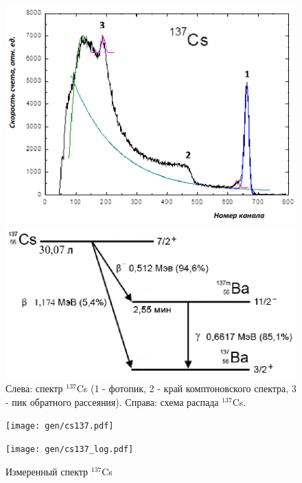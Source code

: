 \documentclass[12pt,a4paper]{article}
\begin{document}
	\begin{figure}[H]
		\centering
		\begin{minipage}{0.55\textwidth}
			\centering
			\includegraphics[width=0.9\linewidth]{res/cs_spectre.png}
		\end{minipage}%
		\begin{minipage}{0.45\textwidth}
			\centering
			\includegraphics[width=1.0\linewidth]{res/cs_levels.png}
		\end{minipage}
		\caption{\centering
			Слева: спектр $^{137}$Cs (1 - фотопик, 2 - край комптоновского спектра, 3 - пик обратного рассеяния).
			Справа: схема распада $^{137}$Cs.}
		\label{fig:cs_scheme}
	\end{figure}
	
	\begin{figure}[H]
		\centering
		\begin{minipage}{0.5\textwidth}
			\centering
			\texttt{[image: gen/cs137.pdf]}
		\end{minipage}%
		\begin{minipage}{0.5\textwidth}
			\centering
			\texttt{[image: gen/cs137\_log.pdf]}
		\end{minipage}
		\caption{Измеренный спектр $^{137}$Cs}
		\label{fig:cs_spectrum}
	\end{figure}
	
\end{document}
